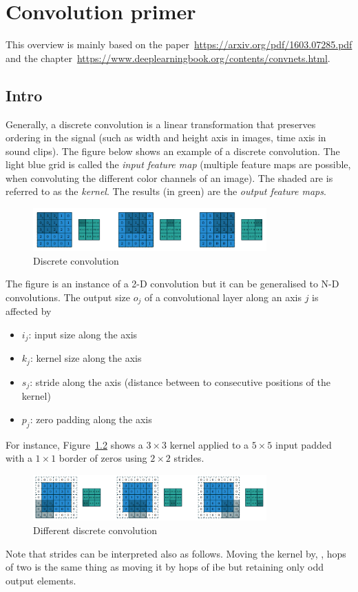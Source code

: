 \chapter{Convolution primer}\label{chap:appendix:conv}
This overview is mainly based on the
paper~\url{https://arxiv.org/pdf/1603.07285.pdf} and the
chapter~\url{https://www.deeplearningbook.org/contents/convnets.html}.

\section{Intro}
Generally, a discrete convolution is a linear transformation that preserves
ordering in the signal (such as width and height axis in images, time axis in
sound clips). The figure below shows an example of a discrete convolution. The
light blue grid is called the \emph{input feature map} (multiple feature maps
are possible, \eg when convoluting the different color channels of an
image). The shaded are is referred to as the \emph{kernel}. The results (in
green) are the \emph{output feature maps}.

\begin{figure}[htpb]
  \centering
  \includegraphics[width=0.8\textwidth]{Figures/discrete_convolution_example}
  \caption{Discrete convolution}%
  \label{fig:conv:ex1}
\end{figure}

The figure is an instance of a 2-D convolution but it can be generalised to N-D
convolutions. The output size $o_j$ of a convolutional layer along an axis $j$
is affected by
\begin{itemize}
\item $i_j$: input size along the axis
\item $k_j$: kernel size along the axis
\item $s_j$: stride along the axis (distance between to consecutive positions of
  the kernel)
\item $p_j$: zero padding along the axis
\end{itemize}
For instance, Figure~\ref{fig:conv:ex2} shows a $3\times 3$ kernel applied to a
$5 \times 5$ input padded with a $1 \times 1$ border of zeros using $2 \times 2$
strides.
\begin{figure}[htpb]
  \centering
  \includegraphics[width=0.8\textwidth]{Figures/discrete_convolution_example2}
  \caption{Different discrete convolution}%
  \label{fig:conv:ex2}
\end{figure}
Note that strides can be interpreted also as follows. Moving the kernel by, \eg,
hops of two is the same thing as moving it by hops of ibe but retaining only odd
output elements.

